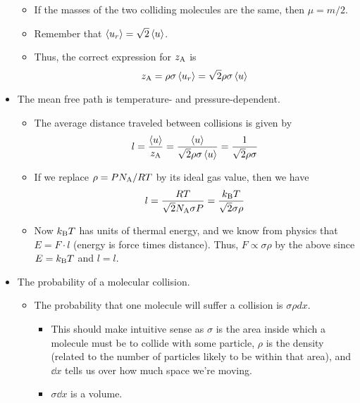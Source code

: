 \documentclass[../notes.tex]{subfiles}
\begin{document}
\begin{itemize}
\begin{itemize}
        \item If the masses of the two colliding molecules are the same, then $\mu=m/2$.
        \item Remember that $\left\langle{u_r}\right\rangle=\sqrt{2}\left\langle{u}\right\rangle$.
        \item Thus, the correct expression for $z_{\ce{A}}$ is
        \begin{equation*}
            z_{\ce{A}} = \rho\sigma\prb{u_r}
            = \sqrt{2}\rho\sigma\prb{u}
        \end{equation*}
    \end{itemize}
    \item The mean free path is temperature- and pressure-dependent.
    \begin{itemize}
        \item The average distance traveled between collisions is given by
        \begin{equation*}
            l = \frac{\prb{u}}{z_{\ce{A}}}
            = \frac{\prb{u}}{\sqrt{2}\rho\sigma\prb{u}}
            = \frac{1}{\sqrt{2}\rho\sigma}
        \end{equation*}
        \item If we replace $\rho=PN_\text{A}/RT$ by its ideal gas value, then we have
        \begin{equation*}
            l = \frac{RT}{\sqrt{2}N_\text{A}\sigma P}
            = \frac{k_\text{B} T}{\sqrt{2}\sigma\rho}
        \end{equation*}
        \item Now $k_\text{B} T$ has units of thermal energy, and we know from physics that $E=F\cdot l$ (energy is force times distance). Thus, $F\propto\sigma\rho$ by the above since $E=k_\text{B} T$ and $l=l$.
    \end{itemize}
    \item The probability of a molecular collision.
    \begin{itemize}
        \item The probability that one molecule will suffer a collision is $\sigma\rho dx$.
        \begin{itemize}
            \item This should make intuitive sense as $\sigma$ is the area inside which a molecule must be to collide with some particle, $\rho$ is the density (related to the number of particles likely to be within that area), and $\dd{x}$ tells us over how much space we're moving.
            \item $\sigma\dd{x}$ is a volume.
        \end{itemize}

\end{itemize}
\end{itemize}
\end{document}
